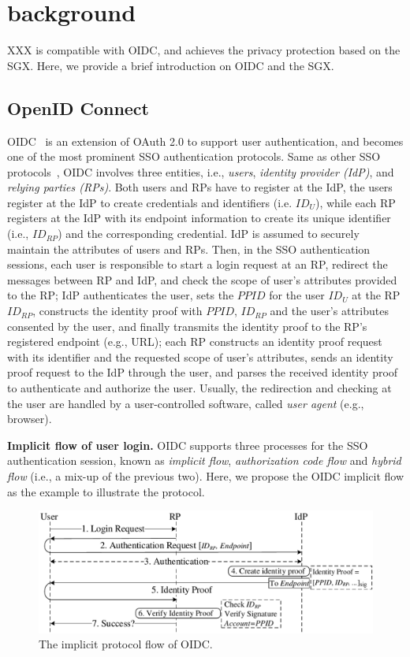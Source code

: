 \section{background}
XXX is compatible with OIDC, and achieves the privacy protection based on the SGX.
Here, we provide a brief introduction on OIDC and the SGX.
\subsection{OpenID Connect}
OIDC~\cite{OpenIDConnect} is an extension of OAuth 2.0 to support user authentication,
 and becomes one of the most prominent SSO authentication protocols.
Same as other SSO protocols~\cite{SAMLIdentifier}, OIDC involves three entities, i.e., {\em users}, {\em identity provider (IdP)}, and {\em relying parties (RPs)}.
Both users and RPs have to register at the IdP,    
the users register at the IdP to create credentials and identifiers (i.e. $ID_U$), 
while each RP registers at the IdP with its endpoint information to create its unique identifier (i.e., $ID_{RP}$) and the corresponding credential.
IdP is assumed to securely maintain the attributes  of users and RPs.   
Then, in the SSO authentication sessions, 
 each user is responsible to start a login request at an RP, redirect the messages between RP and IdP, and check the scope of user's attributes provided to the RP;
 IdP authenticates the user, sets the $PPID$ for the user $ID_U$ at the RP $ID_{RP}$,
 constructs the identity proof with  $PPID$, $ID_{RP}$ and the user's attributes consented by the user, and finally transmits the identity proof to the RP's registered endpoint (e.g., URL);
 each RP constructs an identity proof request with its identifier and the requested scope of  user's attributes, sends an identity proof request to the IdP through the user, and parses the received identity proof to authenticate and authorize the user.
Usually, the redirection and checking at the user are handled by a user-controlled software, called {\em user agent} (e.g., browser).

\noindent\textbf{Implicit flow of user login.}
OIDC supports three processes for the SSO authentication session, known as {\em implicit flow}, {\em authorization code flow} and {\em hybrid flow} (i.e., a mix-up of the previous two). Here, we propose the OIDC implicit flow as the example to illustrate the protocol. 

\begin{figure}[t]
  \centering
  \includegraphics[width=\linewidth]{fig/OIDC1.pdf}
  \caption{The implicit protocol flow of OIDC.}
  \label{fig:OpenID}
\end{figure}

